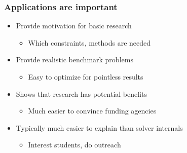 
\begin{frame}
\frametitle{Applications are important}
\begin{itemize}
\item Provide motivation for basic research
\begin{itemize}
\item Which constraints, methods are needed
\end{itemize}
\item Provide realistic benchmark problems
\begin{itemize}
\item Easy to optimize for pointless results
\end{itemize}
\item Shows that research has potential benefits
\begin{itemize}
\item Much easier to convince funding agencies
\end{itemize}
\item Typically much easier to explain than solver internals
\begin{itemize}
\item Interest students, do outreach
\end{itemize}
\end{itemize}
\end{frame}

